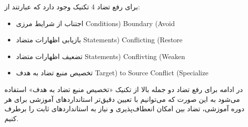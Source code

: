 \documentclass[a4paper,10pt]{article}
\begin{document}
    برای رفع تضاد 4 تکنیک وجود دارد که عبارتند از:

    \begin{itemize}
        
        \item اجتناب از شرایط مرزی Conditions) Boundary (Avoid

        \item بازیابی اظهارات متضاد Statements) Conflicting (Restore

        \item تضعیف اظهارات متضاد Statements) Conflivting (Weaken

        \item تخصیص منبع تضاد به هدف Target) to Source Conflict (Specialize

    \end{itemize}

    در ادامه برای رفع تضاد دو جمله بالا از تکنیک «تخصیص منبع تضاد به هدف» استفاده می‌شود به این صورت که می‌توانیم با تعیین دقیق‌تر استانداردهای آموزشی برای هر دوره آموزشی، تضاد بین امکان انعطاف‌پذیری و نیاز به استانداردهای ثابت را برطرف کنیم.
\end{document}
